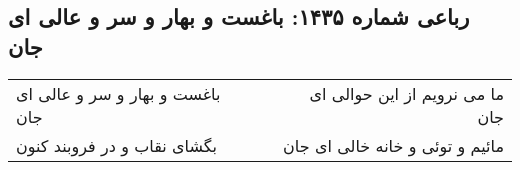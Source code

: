 \begin{center}
\section*{رباعی شماره ۱۴۳۵: باغست و بهار و سر و عالی ای جان}
\label{sec:1435}
\begin{longtable}{l p{0.5cm} r}
باغست و بهار و سر و عالی ای جان
&&
ما می نرویم از این حوالی ای جان
\\
بگشای نقاب و در فروبند کنون
&&
مائیم و توئی و خانه خالی ای جان
\\
\end{longtable}
\end{center}
